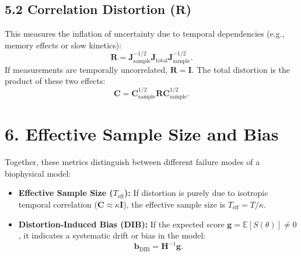 \documentclass[11pt]{article}
\begin{document}
\subsection*{5.2 Correlation Distortion ($\mathbf{R}$)}
This measures the inflation of uncertainty due to temporal dependencies (e.g., memory effects or slow kinetics):
\begin{equation}
\mathbf{R} = \mathbf{J}_{\mathrm{sample}}^{-1/2} \mathbf{J}_{\mathrm{total}} \mathbf{J}_{\mathrm{sample}}^{-1/2}.
\end{equation}
If measurements are temporally uncorrelated, $\mathbf{R} = \mathbf{I}$. The total distortion is the product of these two effects:
\begin{equation}
\mathbf{C} = \mathbf{C}_{\mathrm{sample}}^{1/2} \mathbf{R} \mathbf{C}_{\mathrm{sample}}^{1/2}.
\end{equation}

\section*{6. Effective Sample Size and Bias}

Together, these metrics distinguish between different failure modes of a biophysical model:

\begin{itemize}
    \item \textbf{Effective Sample Size ($T_{\mathrm{eff}}$):} If distortion is purely due to isotropic temporal correlation ($\mathbf{C} \approx \kappa \mathbf{I}$), the effective sample size is $T_{\mathrm{eff}} = T/\kappa$.
    \item \textbf{Distortion-Induced Bias (DIB):} If the expected score $\mathbf{g} = \mathbb{E}[S(\theta)] \neq 0$, it indicates a systematic drift or bias in the model:
    \begin{equation}
    \mathbf{b}_{\mathrm{DIB}} = \mathbf{H}^{-1} \mathbf{g}.
    \end{equation}
\end{itemize}
\end{document}
